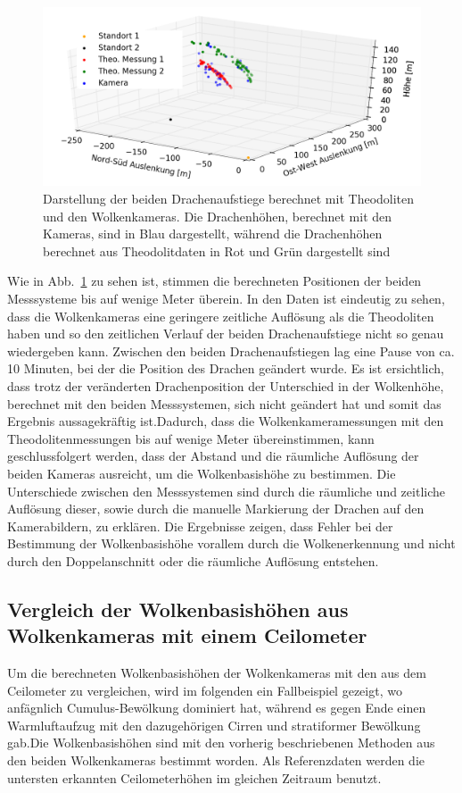 \documentclass[a4paper,11pt,twoside,german]{article}
\newcommand{\absatz}{\smallbreak}
\begin{document}
\begin{figure}[h]
	\begin{center}
		\includegraphics[width=1\textwidth]{media/dragon_theo.png}
		\caption[Drachenaufstieg]{Darstellung der beiden Drachenaufstiege berechnet mit Theodoliten und den Wolkenkameras.  Die Drachenhöhen, berechnet mit den Kameras, sind in Blau dargestellt, während die Drachenhöhen berechnet aus Theodolitdaten in Rot und Grün dargestellt sind}
		\label{FIGTheoDragon}
	\end{center}
\end{figure}
Wie in Abb.~\ref{FIGTheoDragon} zu sehen ist, stimmen die berechneten Positionen
der beiden Messsysteme bis auf wenige Meter überein. In den Daten ist eindeutig
zu sehen, dass die Wolkenkameras eine geringere zeitliche Auflösung als die
Theodoliten haben und so den zeitlichen Verlauf der beiden Drachenaufstiege
nicht so genau wiedergeben kann. Zwischen den beiden Drachenaufstiegen lag eine
Pause von ca. 10 Minuten, bei der die Position des Drachen geändert wurde. Es
ist ersichtlich, dass trotz der veränderten Drachenposition der Unterschied in
der Wolkenhöhe, berechnet mit den beiden Messsystemen, sich nicht geändert hat
und somit das Ergebnis aussagekräftig ist.\absatz Dadurch, dass die
Wolkenkameramessungen mit den Theodolitenmessungen bis auf wenige Meter
übereinstimmen, kann geschlussfolgert werden, dass der Abstand und die räumliche
Auflösung der beiden Kameras ausreicht, um die Wolkenbasishöhe zu bestimmen. Die
Unterschiede zwischen den Messsystemen sind durch die räumliche und zeitliche
Auflösung dieser, sowie durch die manuelle Markierung der Drachen auf den
Kamerabildern, zu erklären. Die Ergebnisse zeigen, dass Fehler bei der
Bestimmung der Wolkenbasishöhe vorallem durch die Wolkenerkennung und nicht
durch den Doppelanschnitt oder die räumliche Auflösung entstehen.

\subsection{Vergleich der Wolkenbasishöhen aus Wolkenkameras mit einem Ceilometer}
\label{SECCeilo}
Um die berechneten Wolkenbasishöhen der Wolkenkameras mit den aus dem Ceilometer
zu vergleichen, wird im folgenden ein Fallbeispiel gezeigt, wo anfägnlich
Cumulus-Bewölkung dominiert hat, während es gegen Ende einen Warmluftaufzug mit
den dazugehörigen Cirren und stratiformer Bewölkung gab.\absatz Die
Wolkenbasishöhen sind mit den vorherig beschriebenen Methoden aus den beiden
Wolkenkameras bestimmt worden. Als Referenzdaten werden die untersten erkannten
Ceilometerhöhen im gleichen Zeitraum benutzt.\absatz
\end{document}
